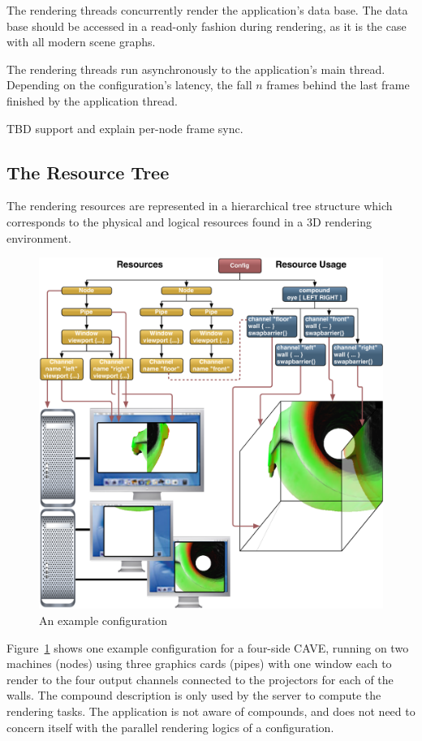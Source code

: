 \documentclass[10pt,a4]{scrartcl}
\newcommand{\fig}[1]{Figure~\ref{#1}}
\begin{document}
The rendering threads concurrently render the application's data
base. The data base should be accessed in a read-only fashion during
rendering, as it is the case with all modern scene graphs.

The rendering threads run asynchronously to the application's main
thread. Depending on the configuration's latency, the fall $n$ frames
behind the last frame finished by the application thread.

TBD support and explain per-node frame sync.
\fi

\subsection{\label{sResource}The Resource Tree}

The rendering resources are represented in a hierarchical tree structure
which corresponds to the physical and logical resources found in a 3D
rendering environment. 

\begin{figure}[ht!]\center
  \includegraphics[width=.9\textwidth]{images/cave.pdf}
  {\caption{\small\label{fConfig}An example configuration}}
\end{figure}

\fig{fConfig} shows one example configuration for a four-side
CAVE, running on two machines (nodes) using three graphics
cards (pipes) with one window each to render to the four output channels
connected to the projectors for each of the walls. The compound
description is only used by the server to compute the rendering
tasks. The application is not aware of compounds, and does not need to
concern itself with the parallel rendering logics of a configuration.
\end{document}
